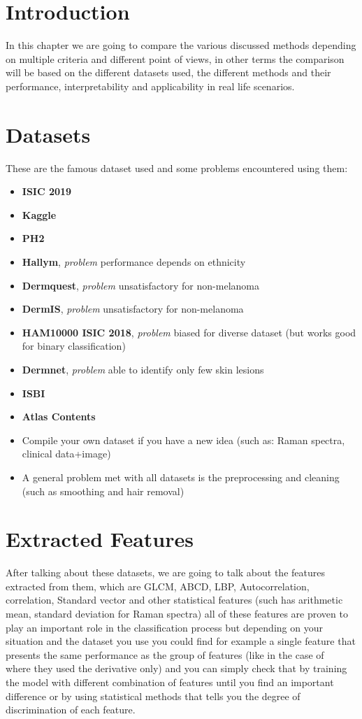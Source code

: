 \section{Introduction}
In this chapter we are going to compare the various discussed methods  depending on multiple criteria and different point of views, in other terms the comparison will be based on the different datasets used, the different methods and their performance, interpretability and applicability in real life scenarios.

\section{Datasets}
    These are the famous dataset used and some problems encountered using them:\\ 
    \begin{itemize}
    \item \textbf{ISIC 2019}
    \item \textbf{Kaggle}
    \item \textbf{PH2}
    \item \textbf{Hallym}, \emph{problem} performance depends on ethnicity
    \item \textbf{Dermquest}, \emph{problem} unsatisfactory for non-melanoma
    \item \textbf{DermIS}, \emph{problem} unsatisfactory for non-melanoma
    \item \textbf{HAM10000 ISIC 2018}, \emph{problem} biased for diverse dataset (but works good for binary classification)
    \item \textbf{Dermnet}, \emph{problem} able to identify only few skin lesions
    \item \textbf{ISBI}
    \item \textbf{Atlas Contents}
    \item Compile your own dataset if you have a new idea (such as: Raman spectra, clinical data+image)
    \item A general problem met with all datasets is the preprocessing and cleaning (such as smoothing and hair removal)
\end{itemize}


\section{Extracted Features}
    After talking about these datasets, we are going to talk about the features extracted from them, which are GLCM, ABCD, LBP, Autocorrelation, correlation, Standard vector and other statistical features (such has arithmetic mean, standard deviation for Raman spectra) all of these features are proven to play an important role in the classification process but depending on your situation and the dataset you use you could find for example a single feature that presents the same performance as the group of features (like in the case of ~\cite{Daniella2021} where they used the derivative only) and you can simply check that by training the model with different combination of features until you find an important difference or by using statistical methods that tells you the degree of discrimination of each feature.

